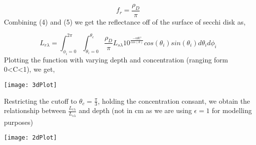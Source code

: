 \documentclass{article}
\begin{document}
\begin{equation}
  f_r = \frac{\rho_D}{\pi}
\end{equation}
Combining (4) and (5) we get the reflectance off of the surface of secchi disk as,

\begin{equation}
  L_{r \lambda} = \int^{2\pi}_{\phi_i = 0}\int^{\theta_c}_{\theta_i = 0}
  \frac{\rho_D}{\pi} L_{s\lambda} 10^\frac{-\epsilon d C}{cos(\theta)}cos(\theta_i)sin(\theta_i)d\theta_i d\phi_i
\end{equation}
Plotting the function with varying depth and concentration (ranging form 0<C<1), we get,

\begin{center}
    \texttt{[image: 3dPlot]}
\end{center}
Restricting the cutoff to $ \theta_c = \frac{\pi}{3}$, holding the concentration consant,
we obtain the relationship between $ \frac{L_{r\lambda}}{L_{s\lambda}}$ and depth (not in cm as we are using
$ \epsilon =1$ for modelling purposes)
\begin{center}
    \texttt{[image: 2dPlot]}
\end{center}
\newline
\end{document}
